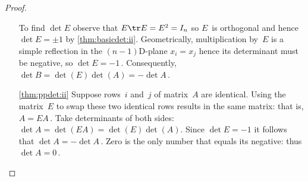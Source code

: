 \begin{proof}
\begin{itemize}
To find \(\det E\) observe that \(E\tr E=E^2=I_n\) so \(E\)~is orthogonal and hence \(\det E=\pm 1\) by \autoref{thm:basicdet:ii}.
Geometrically, multiplication by~\(E\) is a simple reflection in the $(n-1)$D-plane \(x_i=x_j\) hence its determinant must be negative, so \(\det E=-1\)\,.
Consequently, \(\det B=\det(E)\det(A)=-\det A\)\,.

\item[\ref{thm:ppdet:ii}]
Suppose rows~\(i\) and~\(j\) of matrix~\(A\) are identical.
Using the matrix~\(E\) to swap these two identical rows results in the same matrix: that is, \(A=EA\)\,.
Take determinants of both sides: \(\det A=\det(EA)=\det(E)\det(A)\).
Since \(\det E=-1\) it follows that \(\det A=-\det A\)\,.
Zero is the only number that equals its negative: thus \(\det A=0\)\,.
\end{itemize}
\end{proof}





